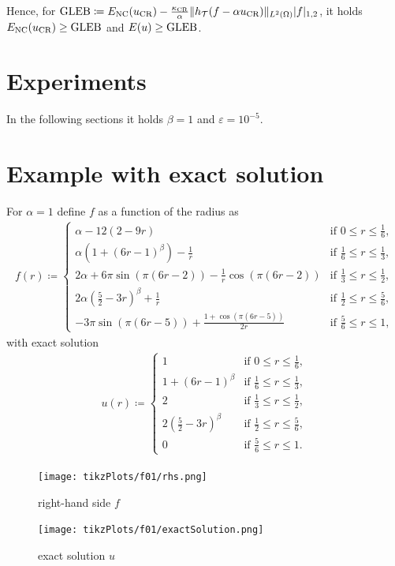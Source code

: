 \documentclass[draft=false,twoside,12pt]{scrreprt}
\begin{document}
Hence, for $\textup{GLEB} \coloneqq 
  E_\textup{NC}(u_\textup{CR}) - \frac{\kappa_{\textup{CR}}}{\alpha}\Vert
  h_\mathcal{T}(f-\alpha u_\textup{CR})\Vert_{L^2(\Omega)} |f|_{1,2}$, it holds
  $E_\textup{NC}(u_\textup{CR})\geq \textup{GLEB}$ and $E(u)\geq \textup{GLEB}$.
\section{Experiments}
In the following sections it holds $\beta = 1$ and $\varepsilon=10^{-5}$.
\section{Example with exact solution}
For $\alpha = 1$ define $f$ as a function of the radius as
\begin{align}
  \label{equ:f01}
  f(r)\coloneqq 
  \begin{cases}
    \alpha-12(2-9r) & \text{if } 0\leq r\leq\frac{1}{6},\\
    \alpha(1+(6r-1)^\beta)-\frac{1}{r} & \text{if } \frac{1}{6}\leq r\leq
    \frac{1}{3},\\
    2\alpha+6\pi\sin(\pi(6r-2))-\frac{1}{r}\cos(\pi(6r-2)) &
    \text{if } \frac{1}{3}\leq r\leq\frac{1}{2},\\
    2\alpha(\frac{5}{2}-3r)^\beta+\frac{1}{r}&
    \text{if } \frac{1}{2}\leq r\leq\frac{5}{6},\\
    -3\pi\sin(\pi(6r-5))+\frac{1+\cos(\pi(6r-5))}{2r} &
    \text{if } \frac{5}{6}\leq r\leq 1,
  \end{cases}
\end{align}
with exact solution
\begin{align}
  \label{equ:f01exactSol}
  u(r)\coloneqq
  \begin{cases}
    1 & \text{if } 0\leq r\leq\frac{1}{6},\\
    1+(6r-1)^\beta & \text{if } \frac{1}{6}\leq r\leq
    \frac{1}{3},\\
    2 &
    \text{if } \frac{1}{3}\leq r\leq\frac{1}{2},\\
    2(\frac{5}{2}-3r)^\beta &
    \text{if } \frac{1}{2}\leq r\leq\frac{5}{6},\\
    0 &
    \text{if } \frac{5}{6}\leq r\leq 1.
  \end{cases}
\end{align}

\begin{minipage}[t]{0.45\textwidth}
  \begin{figure}[H]
	  \centering
		\texttt{[image: tikzPlots/f01/rhs.png]} 
		\caption{right-hand side $f$}
  \end{figure}
\end{minipage}
\begin{minipage}[t]{0.45\textwidth}
  \begin{figure}[H]
	  \centering
		\texttt{[image: tikzPlots/f01/exactSolution.png]} 
		\caption{exact solution $u$}
  \end{figure}
\end{minipage}
\end{document}
